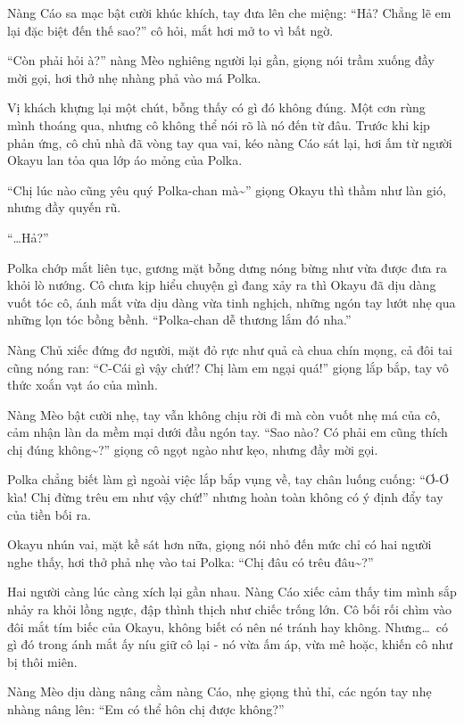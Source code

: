 \documentclass[../main.tex]{subfiles}
\begin{document}
Nàng Cáo sa mạc bật cười khúc khích, tay đưa lên che miệng: ``Hả? Chẳng lẽ em lại đặc biệt đến thế sao?'' cô hỏi, mắt hơi mở to vì bất ngờ.

``Còn phải hỏi à?'' nàng Mèo nghiêng người lại gần, giọng nói trầm xuống đầy mời gọi, hơi thở nhẹ nhàng phả vào má Polka.

Vị khách khựng lại một chút, bỗng thấy có gì đó không đúng. Một cơn rùng mình thoáng qua, nhưng cô không thể nói rõ là nó đến từ đâu. Trước khi kịp phản ứng, cô chủ nhà đã vòng tay qua vai, kéo nàng Cáo sát lại, hơi ấm từ người Okayu lan tỏa qua lớp áo mỏng của Polka.

``Chị lúc nào cũng yêu quý Polka-chan mà\~{}'' giọng Okayu thì thầm như làn gió, nhưng đầy quyến rũ.

``\dots Hả?''

Polka chớp mắt liên tục, gương mặt bỗng dưng nóng bừng như vừa được đưa ra khỏi lò nướng. Cô chưa kịp hiểu chuyện gì đang xảy ra thì Okayu đã dịu dàng vuốt tóc cô, ánh mắt vừa dịu dàng vừa tinh nghịch, những ngón tay lướt nhẹ qua những lọn tóc bồng bềnh. ``Polka-chan dễ thương lắm đó nha.''

Nàng Chủ xiếc đứng đơ người, mặt đỏ rực như quả cà chua chín mọng, cả đôi tai cũng nóng ran: ``C-Cái gì vậy chứ!? Chị làm em ngại quá!'' giọng lắp bắp, tay vô thức xoắn vạt áo của mình.

Nàng Mèo bật cười nhẹ, tay vẫn không chịu rời đi mà còn vuốt nhẹ má của cô, cảm nhận làn da mềm mại dưới đầu ngón tay. ``Sao nào? Có phải em cũng thích chị đúng không\~{}?'' giọng cô ngọt ngào như kẹo, nhưng đầy mời gọi.

Polka chẳng biết làm gì ngoài việc lắp bắp vụng về, tay chân luống cuống: ``Ơ-Ơ kìa! Chị đừng trêu em như vậy chứ!'' nhưng hoàn toàn không có ý định đẩy tay của tiền bối ra.

Okayu nhún vai, mặt kề sát hơn nữa, giọng nói nhỏ đến mức chỉ có hai người nghe thấy, hơi thở phả nhẹ vào tai Polka: ``Chị đâu có trêu đâu\~{}?''

Hai người càng lúc càng xích lại gần nhau. Nàng Cáo xiếc cảm thấy tim mình sắp nhảy ra khỏi lồng ngực, đập thình thịch như chiếc trống lớn. Cô bối rối chìm vào đôi mắt tím biếc của Okayu, không biết có nên né tránh hay không. Nhưng\dots\ có gì đó trong ánh mắt ấy níu giữ cô lại - nó vừa ấm áp, vừa mê hoặc, khiến cô như bị thôi miên.

Nàng Mèo dịu dàng nâng cằm nàng Cáo, nhẹ giọng thủ thỉ, các ngón tay nhẹ nhàng nâng lên: ``Em có thể hôn chị được không?''
\end{document}
